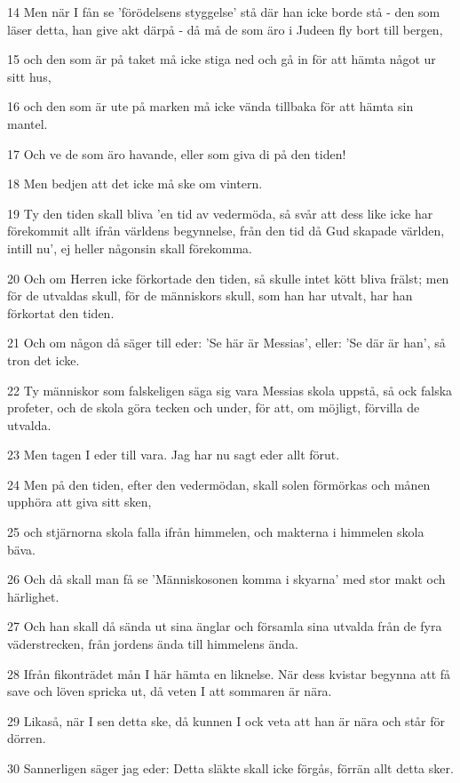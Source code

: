 \par 14 Men när I fån se 'förödelsens styggelse' stå där han icke borde stå - den som läser detta, han give akt därpå - då må de som äro i Judeen fly bort till bergen,
\par 15 och den som är på taket må icke stiga ned och gå in för att hämta något ur sitt hus,
\par 16 och den som är ute på marken må icke vända tillbaka för att hämta sin mantel.
\par 17 Och ve de som äro havande, eller som giva di på den tiden!
\par 18 Men bedjen att det icke må ske om vintern.
\par 19 Ty den tiden skall bliva 'en tid av vedermöda, så svår att dess like icke har förekommit allt ifrån världens begynnelse, från den tid då Gud skapade världen, intill nu', ej heller någonsin skall förekomma.
\par 20 Och om Herren icke förkortade den tiden, så skulle intet kött bliva frälst; men för de utvaldas skull, för de människors skull, som han har utvalt, har han förkortat den tiden.
\par 21 Och om någon då säger till eder: 'Se här är Messias', eller: 'Se där är han', så tron det icke.
\par 22 Ty människor som falskeligen säga sig vara Messias skola uppstå, så ock falska profeter, och de skola göra tecken och under, för att, om möjligt, förvilla de utvalda.
\par 23 Men tagen I eder till vara. Jag har nu sagt eder allt förut.
\par 24 Men på den tiden, efter den vedermödan, skall solen förmörkas och månen upphöra att giva sitt sken,
\par 25 och stjärnorna skola falla ifrån himmelen, och makterna i himmelen skola bäva.
\par 26 Och då skall man få se 'Människosonen komma i skyarna' med stor makt och härlighet.
\par 27 Och han skall då sända ut sina änglar och församla sina utvalda från de fyra väderstrecken, från jordens ända till himmelens ända.
\par 28 Ifrån fikonträdet mån I här hämta en liknelse. När dess kvistar begynna att få save och löven spricka ut, då veten I att sommaren är nära.
\par 29 Likaså, när I sen detta ske, då kunnen I ock veta att han är nära och står för dörren.
\par 30 Sannerligen säger jag eder: Detta släkte skall icke förgås, förrän allt detta sker.
